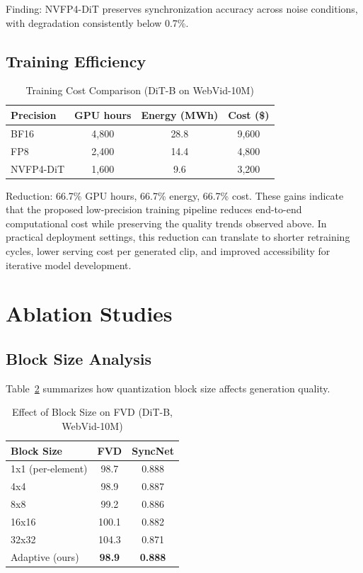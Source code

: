 \documentclass[journal,twoside]{IEEEtran}
\theoremstyle{definition}
\theoremstyle{remark}
\begin{document}
Finding: NVFP4-DiT preserves synchronization accuracy across noise conditions, with degradation consistently below 0.7\%.

\FloatBarrier
\subsection{Training Efficiency}

\begin{table}[H]
\centering
\caption{Training Cost Comparison (DiT-B on WebVid-10M)}
\label{tab:training_cost}
\begin{tabular}{lccc}
\toprule
Precision & GPU hours & Energy (MWh) & Cost (\$) \\
\midrule
BF16 & 4,800 & 28.8 & 9,600 \\
FP8 & 2,400 & 14.4 & 4,800 \\
NVFP4-DiT & 1,600 & 9.6 & 3,200 \\
\bottomrule
\end{tabular}
\end{table}

Reduction: 66.7\% GPU hours, 66.7\% energy, 66.7\% cost. These gains indicate that the proposed low-precision training pipeline reduces end-to-end computational cost while preserving the quality trends observed above. In practical deployment settings, this reduction can translate to shorter retraining cycles, lower serving cost per generated clip, and improved accessibility for iterative model development.

\section{Ablation Studies}
\label{sec:ablation}

\subsection{Block Size Analysis}

Table~\ref{tab:block_size} summarizes how quantization block size affects generation quality.

\begin{table}[H]
\centering
\caption{Effect of Block Size on FVD (DiT-B, WebVid-10M)}
\label{tab:block_size}
\begin{tabular}{lcc}
\hline
Block Size & FVD & SyncNet \\
\hline
1x1 (per-element) & 98.7 & 0.888 \\
4x4 & 98.9 & 0.887 \\
8x8 & 99.2 & 0.886 \\
16x16 & 100.1 & 0.882 \\
32x32 & 104.3 & 0.871 \\
Adaptive (ours) & \textbf{98.9} & \textbf{0.888} \\
\hline
\end{tabular}
\end{table}
\end{document}
